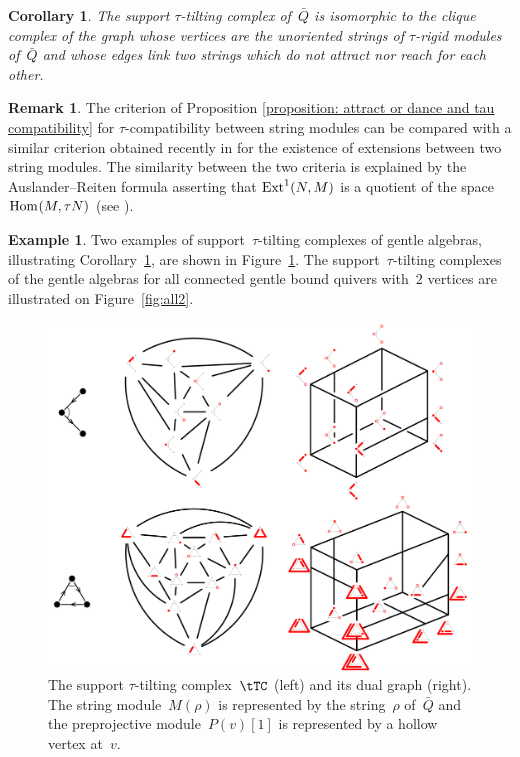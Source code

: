 \documentclass{amsart}
\newtheorem{corollary}[theorem]{Corollary}
\theoremstyle{definition}
\newtheorem{example}[theorem]{Example}
\newtheorem{remark}[theorem]{Remark}
\newcommand{\fref}[1]{Figure~\ref{#1}} %
\newcommand{\Hom}[1]{\operatorname{{\rm Hom}}_{#1}}
\newcommand{\Ext}[1]{\operatorname{{\rm Ext}}_{#1}}
\begin{document}
\begin{corollary}
\label{coro: stautilt complex from strings}
The support $\tau$-tilting complex of~$\bar Q$ is isomorphic to the clique complex of the graph whose vertices are the unoriented strings of $\tau$-rigid modules of~$\bar Q$ and whose edges link two strings which do not attract nor reach for each other.
\end{corollary}

\begin{remark}
The criterion of Proposition \ref{proposition: attract or dance and tau compatibility} for $\tau$-compatibility between string modules can be compared with a similar criterion obtained recently in \cite{CanakciPauksztelloSchroll} for the existence of extensions between two string modules.
The similarity between the two criteria is explained by the Auslander--Reiten formula asserting that $\Ext{}^1(N,M)$ is a quotient of the space $\Hom{}(M,\tau N)$ (see \cite[Thm.~IV.2.13]{AssemSimsonSkowronski}).
\end{remark}


\begin{example}
Two examples of support~$\tau$-tilting complexes of gentle algebras, illustrating Corollary~\ref{coro: stautilt complex from strings}, are shown in Figure~\ref{fig:exmtTC}.
The support~$\tau$-tilting complexes of the gentle algebras for all connected gentle bound quivers with~$2$ vertices are illustrated on \fref{fig:all2}.

\begin{figure}[h]
	\capstart
	\centerline{\includegraphics[scale=.5]{exmtTC}}
	\caption{The support $\tau$-tilting complex~$\tTC$ (left) and its dual graph (right). The string module~$M(\rho)$ is represented by the string~$\rho$ of~$\bar Q$ and the preprojective module~$P(v)[1]$ is represented by a hollow vertex at~$v$.}
	\label{fig:exmtTC}
\end{figure}
\end{example}
\end{document}
